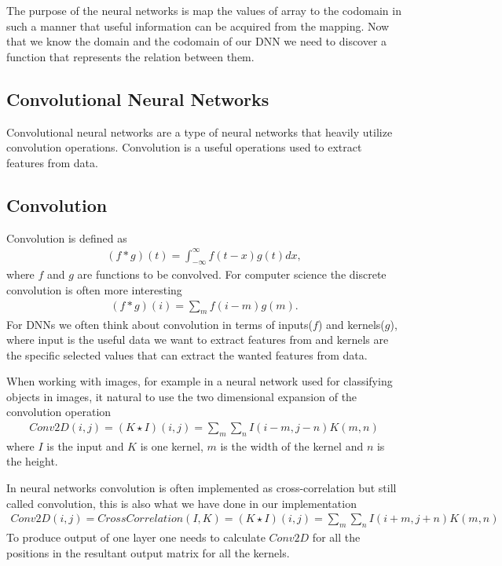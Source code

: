 \documentclass[12pt,a4paper,english
]{tunithesis}
\begin{document}
The purpose of the neural networks is map the values of array to the codomain in such a manner that useful information can be acquired from the mapping.
Now that we know the domain and the codomain of our DNN we need to discover a function that represents the relation between them.

\subsection{Convolutional Neural Networks}
Convolutional neural networks are a type of neural networks that heavily utilize convolution operations. Convolution is a useful operations used to extract features from data.


\subsection{Convolution}
Convolution is defined as
\begin{align}
  (f \ast g)(t) = \int_{-\infty}^{\infty}f(t-x)g(t)dx,
\end{align}
where $f$ and $g$ are functions to be convolved. For computer science the discrete convolution is often more interesting
\begin{align}
  (f \ast g)(i) = \sum_{m}f(i-m)g(m).
\end{align}
For DNNs we often think about convolution in terms of inputs($f$) and kernels($g$), where input is the useful data we want to extract features from and kernels are the specific selected values that can extract the wanted features from data.

When working with images, for example in a neural network used for classifying objects in images, it  natural to use the two dimensional expansion of the convolution operation
\begin{align}
  Conv2D(i, j) = (K \star I)(i,j) = \sum_{m}\sum_{n}I(i-m,j-n)K(m, n)
\end{align}
where $I$ is the input and $K$ is one kernel, $m$ is the width of the kernel and $n$ is the height.

In neural networks convolution is often implemented as cross-correlation but still called convolution, this is also what we have done in our implementation
\begin{align}
  Conv2D(i,j) = CrossCorrelation(I, K) = (K \star I)(i,j) = \sum_{m}\sum_{n}I(i+m,j+n)K(m, n)
\end{align}
To produce output of one layer one needs to calculate $Conv2D$ for all the positions in the resultant output matrix for all the kernels.
\end{document}

